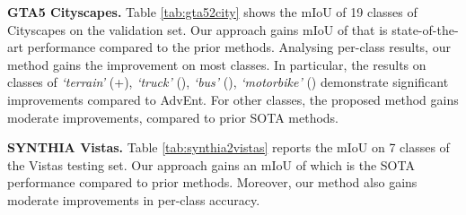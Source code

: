 \documentclass[10pt,twocolumn,letterpaper]{article}
\begin{document}
\textbf{GTA5  Cityscapes.} Table \ref{tab:gta52city} shows the mIoU of 19 classes of Cityscapes on the validation set. Our approach gains mIoU of  that is state-of-the-art performance compared to the prior methods. Analysing per-class results,
our method gains the improvement on most classes. In particular, the results on classes of \textit{`terrain'} (+), \textit{`truck'} (), \textit{`bus'} (), \textit{`motorbike'} () demonstrate significant improvements compared to AdvEnt. 
For other classes, the proposed method gains moderate improvements, compared to prior SOTA methods.





\begin{table}[b]
    \vspace{-6mm}
    \centering
    \caption{\textbf{Semantic segmentation performance mIoU (\%) on Vistas testing set of different models trained on SYNTHIA.} (const. denotes for construction)}
    \label{tab:synthia2vistas}
\end{table}


\textbf{SYNTHIA  Vistas.} Table \ref{tab:synthia2vistas} reports the mIoU on 7 classes of the Vistas testing set. Our approach gains an mIoU of  which is the SOTA performance compared to prior methods. 
Moreover, our method also gains moderate improvements in per-class accuracy.
\end{document}
